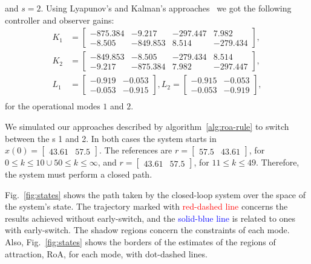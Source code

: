 %
and \(s=2\). Using Lyapunov's and Kalman's
approaches~\parencite{chen:linear,hespanha:linear} we got the following
controller and observer gains:
%
\begin{align*}
  K_1 & = \begin{bmatrix}
    -875.384 & -9.217   & -297.447 & 7.982    \\
    -8.505   & -849.853 & 8.514    & -279.434
  \end{bmatrix}, \\
  K_2 & = \begin{bmatrix}
    -849.853 & -8.505   & -279.434 & 8.514    \\
    -9.217   & -875.384 & 7.982    & -297.447
  \end{bmatrix}, \\
  L_1 & = \begin{bmatrix}
    -0.919 & -0.053 \\
    -0.053 & -0.915
  \end{bmatrix},
  L_2 = \begin{bmatrix}
    -0.915 & -0.053 \\
    -0.053 & -0.919
  \end{bmatrix},   \\
\end{align*}
%
for the operational modes \(1\) and \(2\).

We simulated our approaches described by algorithm~\ref{alg:roa-rule} to switch
between the \CG{}s 1 and 2. In both cases the system starts in \(x(0) =
\begin{bmatrix}43.61 & 57.5\end{bmatrix}\). The references are \(r =
\begin{bmatrix}57.5 & 43.61\end{bmatrix}\), for \(0\leq k\leq 10 \cup 50 \leq k
\leq\infty{}\), and \(r = \begin{bmatrix}43.61& 57.5\end{bmatrix}\), for \(11
\leq k \leq 49\). Therefore, the system must perform a closed path.

Fig.~\ref{fig:states} shows the path taken by the closed-loop system over the
space of the system's state. The trajectory marked with
\textcolor{red}{red-dashed line} concerns the results achieved without
early-switch, and the \textcolor{blue}{solid-blue line} is related to ones with
early-switch. The shadow regions concern the constraints of each mode. Also,
Fig.~\ref{fig:states} shows the borders of the estimates of the regions of
attraction, RoA, for each mode, with dot-dashed lines.

